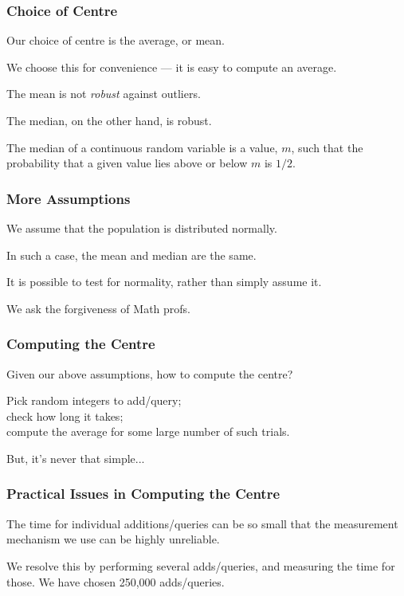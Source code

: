\begin{frame}
\frametitle{Choice of Centre}
\begin{changemargin}{1cm}

Our choice of centre is the average, or mean.

We choose this for convenience --- it is easy to compute an average.

The mean is not \emph{robust} against outliers.

The median, on the other hand, is robust.

The median of a continuous random variable is a value, $m$,
such that the probability that a given value lies above
or below $m$ is $1/2$.

\end{changemargin}
\end{frame}

\begin{frame}
\frametitle{More Assumptions}
\begin{changemargin}{1cm}

We assume that the population is distributed normally. 

In such a case, the mean and median are the same. 

It is possible to test for normality, rather than simply assume it.

We ask the forgiveness of Math profs.

\end{changemargin}
\end{frame}

\begin{frame}
\frametitle{Computing the Centre}
\begin{changemargin}{1cm}

Given our above assumptions, how to compute the centre?

Pick random integers to add/query; \\
\quad check how long it takes;\\
\quad compute the average for some large number of such
trials.

But, it's never that simple...

\end{changemargin}
\end{frame}

\begin{frame}
\frametitle{Practical Issues in Computing the Centre}
\begin{changemargin}{1cm}

The time for individual additions/queries can be
	so small that the measurement mechanism we use can
	be highly unreliable.

We resolve this by performing
	several adds/queries, and measuring the time for those.
	We have chosen 250,000 adds/queries.

\end{changemargin}
\end{frame}


